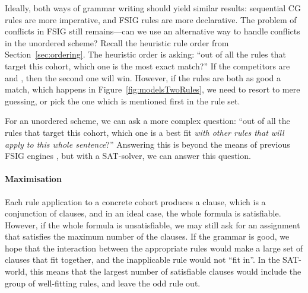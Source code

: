 Ideally, both ways of grammar writing should yield similar results:
sequential CG rules are more imperative, and FSIG rules are more declarative.
The problem of conflicts in FSIG still remains---can we use an alternative way to handle conflicts in the unordered scheme?
%
%
Recall the heuristic rule order from Section~\ref{sec:ordering}. The heuristic order is asking: ``out of all the rules that target this cohort, which one is the most exact match?'' If the competitors are  and , then the second one will win. However, if the rules are both as good a match, which happens in Figure~\ref{fig:modelsTwoRules}, we need to resort to mere guessing, or pick the one which is mentioned first in the rule set.

For an unordered scheme, we can ask a more complex question: ``out of all the rules that target this cohort, which one is a best fit \emph{with other rules that will apply to this whole sentence}?''
Answering this is beyond the means of previous FSIG engines , but with a SAT-solver, we can answer this question. 

\paragraph{Maximisation}

Each rule application to a concrete cohort produces a clause, 
 which is a conjunction of clauses, and in an ideal case, the whole formula is satisfiable. However, if the whole formula is unsatisfiable, we may still ask for an assignment that satisfies the maximum number of the clauses. 
If the grammar is good, we hope that the interaction between the appropriate
rules would make a large set of clauses that fit together, and the
inapplicable rule would not ``fit in''.
In the SAT-world, this means that the largest number of satisfiable clauses would include the group of well-fitting rules, and leave the odd rule out.




